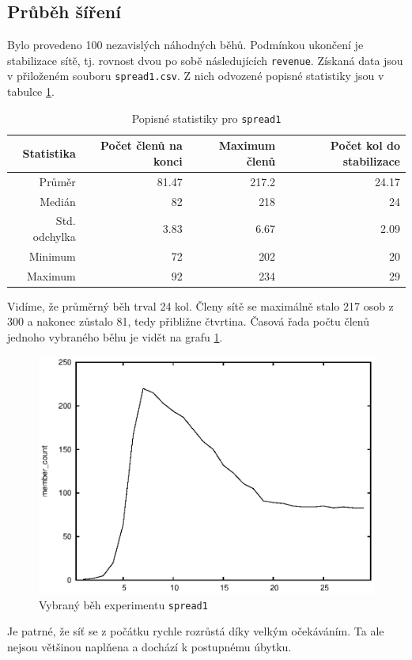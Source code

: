 \documentclass[a4wide,12pt]{report}
\begin{document}
\subsection{Průběh šíření}
Bylo provedeno 100 nezavislých náhodných běhů. Podmínkou ukončení je stabilizace sítě, tj. rovnost dvou po sobě následujících \texttt{revenue}. Získaná data jsou v přiloženém souboru \texttt{spread1.csv}. Z nich odvozené popisné statistiky jsou v tabulce \ref{tab:spread1_desc}.
\begin{table}[h]
  \begin{center}
  \begin{tabular}{|r|r|r|r|}
  \hline
  Statistika&Počet členů na konci	&Maximum členů	&Počet kol do stabilizace\\\hline
  Průměr	&81.47	&217.2	&24.17\\
  Medián	&82	&218	&24\\
  Std. odchylka	&3.83	&6.67	&2.09\\
  Minimum	&72	&202	&20\\
  Maximum	&92	&234	&29\\\hline
  \end{tabular}
  \end{center}
  \caption{Popisné statistiky pro \texttt{spread1}}
  \label{tab:spread1_desc}
\end{table}
Vidíme, že průměrný běh trval 24 kol. Členy sítě se maximálně stalo 217 osob z 300 a nakonec zůstalo 81, tedy přibližne čtvrtina. Časová řada počtu členů jednoho vybraného běhu je vidět na grafu \ref{fig:spread1_run}.
\begin{figure}[h]
  \centering
  \includegraphics{member_count.eps}
  \caption{Vybraný běh experimentu \texttt{spread1}}
  \label{fig:spread1_run}
\end{figure}
Je patrné, že síť se z počátku rychle rozrůstá díky velkým očekáváním. Ta ale nejsou většinou naplňena a dochází k postupnému úbytku.
\end{document}
